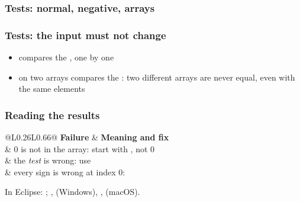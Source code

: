 \documentclass[aspectratio=169,10pt,compress]{beamer}
\begin{document}




\begin{frame}[t,fragile] \frametitle{Tests: normal, negative, arrays}
\end{frame}




\begin{frame}[t,fragile] \frametitle{Tests: the input must not change}

	\begin{itemize}\small
		\item {} compares the , one by one
		\item {} on two arrays compares the : two different arrays
		      are never equal, even with the same elements
	\end{itemize}
\end{frame}




\begin{frame}[t,fragile] \frametitle{Reading the results}


\begin{table}
		\footnotesize
		\begin{tabular}{@{}L{0.26\textwidth}L{0.66\textwidth}@{}}
			\toprule
			\textbf{Failure} & \textbf{Meaning and fix} \\
			\midrule
			      & 0 is not in the array: start with , not 0 \\
			 & the \emph{test} is wrong: use  \\
			     & every sign is wrong at index 0:  \\
			\bottomrule
		\end{tabular}
\end{table}%


	\footnotesize In Eclipse: ; ,  (Windows), ,  (macOS).
\end{frame}
\end{document}
